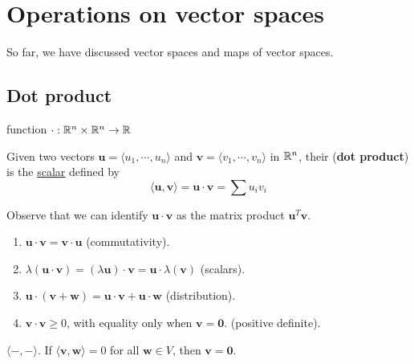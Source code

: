 \section{Operations on vector spaces}

So far, we have discussed vector spaces and maps of vector spaces. 

\subsection{Dot product}

\begin{definition}

function $\cdot: \mathbb{R}^n \times \mathbb{R}^n \to \mathbb{R}$


    Given two vectors $\bm{u} = \langle u_1, \cdots, u_n \rangle$ and $\bm{v}  = \langle v_1 , \cdots, v_n \rangle$ in $\mathbb{R}^n$, their (\textbf{dot product}) is the \underline{scalar} defined by $$\langle \bm{u}, \bm{v}\rangle = \bm{u} \cdot \bm{v} = \sum u_iv_i$$
    \end{definition}

Observe that we can identify $\bm{u} \cdot \bm{v}$ as the matrix product $\bm{u}^{T} \bm{v}$.

\begin{theorem}
    
    \begin{enumerate}
        \item $\bm{u} \cdot \bm{v} = \bm{v} \cdot \bm{u}$ (commutativity).
        \item $\lambda(\bm{u} \cdot \bm{v}) = (\lambda\bm{u}) \cdot \bm{v} = \bm{u} \cdot \lambda(\bm{v})$ (scalars).
        \item $\bm{u} \cdot (\bm{v} + \bm{w}) = \bm{u} \cdot \bm{v} + \bm{u} \cdot \bm{w}$ (distribution).
        \item $\bm{v} \cdot \bm{v} \geq 0$, with equality only when $\bm{v} = \bm{0}$. (positive definite).  
    \end{enumerate}
    
    \end{theorem}




    \begin{proposition}\label{dotproduniqueness}
     $\langle - , - \rangle$.  If $\langle \bm{v}, \bm{w} \rangle = 0$ for all $\bm{w} \in V$, then $\bm{v} = \bm{0}$.
    \end{proposition}
    
